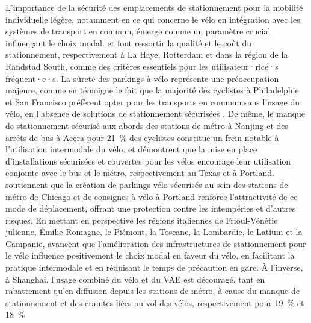 \begin{refsegment}
L'importance de la sécurité des emplacements de stationnement pour la mobilité individuelle légère, notamment en ce qui concerne le vélo en intégration avec les systèmes de transport en commun, émerge comme un paramètre crucial influençant le choix modal. \textcolor{blue}{\textcite[489]{la_paix_puello_role_2021}} et \textcolor{blue}{\textcite[47]{la_paix_puello_modelling_2015}} font ressortir la qualité et le coût du stationnement, respectivement à La Haye, Rotterdam et dans la région de la Randstad South, comme des critères essentiels pour les utilisateur·rice·s fréquent·e·s. La sûreté des parkings à vélo représente une préoccupation majeure, comme en témoigne le fait que la majorité des cyclistes à Philadelphie et San Francisco préfèrent opter pour les transports en commun sans l'usage du vélo, en l'absence de solutions de stationnement sécurisées \textcolor{blue}{\autocite[106]{flamm_public_2014}}. De même, le manque de stationnement sécurisé aux abords des stations de métro à Nanjing \textcolor{blue}{\autocite[191]{yang_metro_2015}} et des arrêts de bus à Accra pour 21~\% des cyclistes \textcolor{blue}{\autocite[112]{quarshie_integrating_2007}} constitue un frein notable à l'utilisation intermodale du vélo. \textcolor{blue}{\textcite[89]{taylor_analysis_1996}} et \textcolor{blue}{\textcite[99-101]{singleton_exploring_2014}} démontrent que la mise en place d'installations sécurisées et couvertes pour les vélos encourage leur utilisation conjointe avec le bus et le métro, respectivement au Texas et à Portland. \textcolor{blue}{\textcite[165]{krizek_assessing_2011}} soutiennent que la création de parkings vélo sécurisés au sein des stations de métro de Chicago et de consignes à vélo à Portland renforce l'attractivité de ce mode de déplacement, offrant une protection contre les intempéries et d'autres risques. En mettant en perspective les régions italiennes de Frioul-Vénétie julienne, Émilie-Romagne, le Piémont, la Toscane, la Lombardie, le Latium et la Campanie, \textcolor{blue}{\textcite[8]{giansoldati_train-feeder_2021}} avancent que l'amélioration des infrastructures de stationnement pour le vélo influence positivement le choix modal en faveur du vélo, en facilitant la pratique intermodale et en réduisant le temps de précaution en gare. À l'inverse, à Shanghai, l'usage combiné du vélo et du \acrshort{VAE} est découragé, tant en rabattement qu'en diffusion depuis les stations de métro, à cause du manque de stationnement et des craintes liées au vol des vélos, respectivement pour 19~\% et 18~\% 
\end{refsegment}
